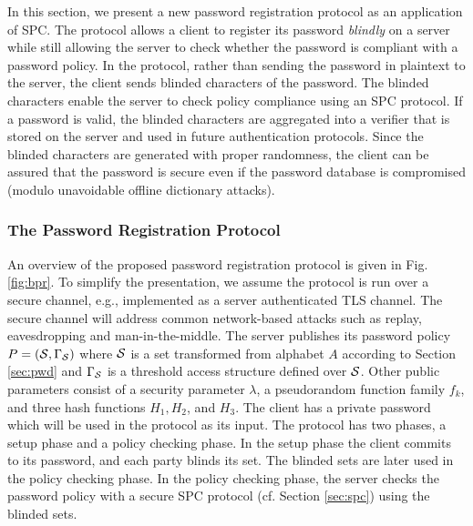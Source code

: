 In this section, we present a new password registration protocol as an application of SPC. 
The protocol allows a client to register its password \emph{blindly} on a server while still allowing the server to check whether the password is compliant with a password policy. 
In the protocol, rather than sending the password in plaintext to the server, the client sends blinded characters of the password. 
The blinded characters enable the server to check policy compliance using an SPC protocol. 
If a password is valid, the blinded characters are aggregated into a verifier that is stored on the server and used in future authentication protocols. 
Since the blinded characters are generated with proper randomness, the client can be assured that the password is secure even if the password database is compromised (modulo unavoidable offline dictionary attacks).

\subsubsection{The Password Registration Protocol}

An overview of the proposed password registration protocol is given in Fig. \ref{fig:bpr}. 
To simplify the presentation, we assume the protocol is run over a secure channel, e.g., implemented as a server authenticated TLS channel. 
The secure channel will address common network-based attacks such as replay, eavesdropping and man-in-the-middle. The server publishes its password policy $P=(\mathcal{S},\Gamma_\mathcal{S})$ where $\mathcal{S}$ is a set transformed from alphabet $A$ according to Section \ref{sec:pwd} and $\Gamma_\mathcal{S}$ is a threshold access structure defined over $\mathcal{S}$. Other public parameters consist of a security parameter $\lambda$, a pseudorandom function family $f_k$, and three hash functions $H_1, H_2$, and $H_3$. The client has a private password \pwd which will be used in the protocol as its input. The protocol has two phases, a setup phase and a policy checking phase. In the setup phase the client commits to its password, and each party blinds its set. 
The blinded sets are later used in the policy checking phase. In the policy checking phase, the server checks the password policy with a secure SPC protocol (cf. Section \ref{sec:spc}) using the blinded sets.

